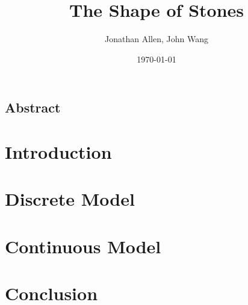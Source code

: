 \documentclass[12pt]{amsart}   %
\begin{document}
\graphicspath{ {figures/} }

\title[Shape of Stones]{The Shape of Stones}
 
\author{Jonathan Allen, John Wang}
\date{\today}

\maketitle

\subsection*{Abstract}

\section{Introduction}


\section{Discrete Model}


\section{Continuous Model}


\section{Conclusion}



\end{document}
